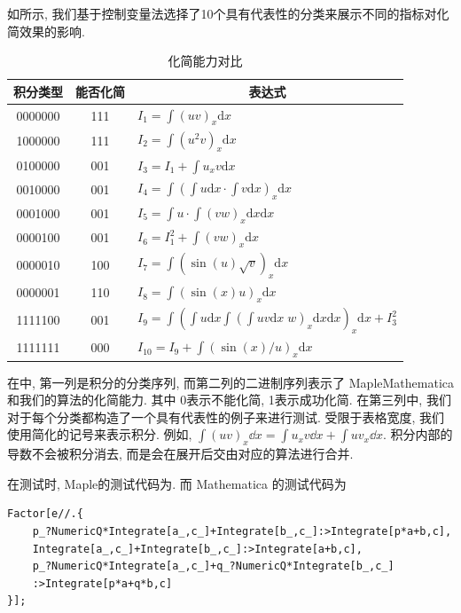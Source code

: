 如所示, 我们基于控制变量法选择了10个具有代表性的分类来展示不同的指标对化简效果的影响. 

\begin{table}[H]
\renewcommand{\arraystretch}{1.0}
\centering
\caption{化简能力对比} \label{tb1}
\renewcommand{\dd}[1]{\mathrm{d}#1}
\renewcommand{\ii}[1]{\int\!{#1\dd x}}
\begin{tabular}{ccl}
\hline
积分类型 & 能否化简 & \multicolumn{1}{c}{表达式} \\
\hline
0000000 & 111 & $I_1=\int\!{(uv)_x\dd x}$\\ 
1000000 & 111 & $I_2=\int\!{(u^2v)_x\dd x}$\\ 
0100000 & 001 & $I_3=I_1+\int\!{u_xv\dd x}$\\ 
0010000 & 001 & $I_4=\int\!{(\int\!{u\dd x}\cdot \int\!{v\dd x})_x\dd x}$\\
0001000 & 001 & $I_5=\int\!{u\cdot \int\!{(vw)_x\dd x}\dd x}$\\
0000100 & 001 & $I_6=I_1^2+\int\!{(vw)_x\dd x}$\\
0000010 & 100 & $I_7=\int\!{(\sin(u)\sqrt{v})_x\dd x}$\\
0000001 & 110 & $I_8=\int\!{(\sin(x)u)_x\dd x}$\\
1111100 & 001 & $I_9=\int\!{(\int\!{u\dd x}\int\!{(\int\!{uv\dd x}\;w)_x\dd x\dd x})_x\dd x}+I_3^2$\\
1111111 & 000 & $I_{10}=I_9+\int\!{(\sin(x)/u)_x\dd x}$\\
\hline
\end{tabular}
\end{table} 

在中, 第一列是积分的分类序列, 而第二列的二进制序列表示了 Maple\D Mathematica 和我们的算法的化简能力. 其中 0表示不能化简, 1表示成功化简. 在第三列中, 我们对于每个分类都构造了一个具有代表性的例子来进行测试. 受限于表格宽度, 我们使用简化的记号来表示积分. 例如, $\int\!{(uv)_x\dd x}=\int\!{u_xv\dd x}+\int\!{uv_x\dd x}$. 积分内部的导数不会被积分消去, 而是会在展开后交由对应的算法进行合并.

在测试时, Maple的测试代码为. 而 Mathematica 的测试代码为
\begin{verbatim}
Factor[e//.{
    p_?NumericQ*Integrate[a_,c_]+Integrate[b_,c_]:>Integrate[p*a+b,c],
    Integrate[a_,c_]+Integrate[b_,c_]:>Integrate[a+b,c],
    p_?NumericQ*Integrate[a_,c_]+q_?NumericQ*Integrate[b_,c_]
    :>Integrate[p*a+q*b,c]
}];
\end{verbatim}

